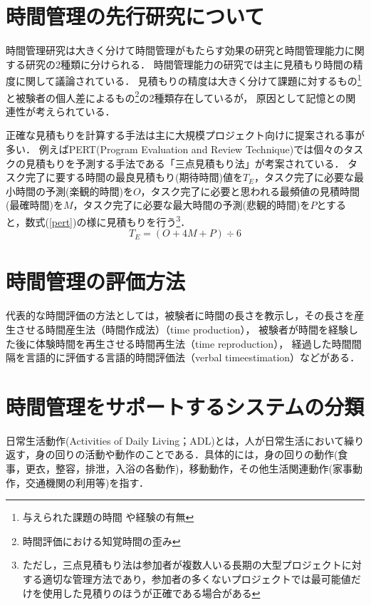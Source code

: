 \section{時間管理の先行研究について}
時間管理研究は大きく分けて時間管理がもたらす効果の研究と時間管理能力に関する研究の2種類に分けられる．
時間管理能力の研究では主に見積もり時間の精度に関して議論されている．
見積もりの精度は大きく分けて課題に対するもの\footnote{与えられた課題の時間 \cite{Roy2008}や経験の有無\cite{Roy2007}}と被験者の個人差によるもの\footnote{時間評価における知覚時間の歪み\cite{Oguro1961}\cite{Murakami2016}}の2種類存在しているが，
原因として記憶との関連性が考えられている\cite{Roy2005}．

正確な見積もりを計算する手法は主に大規模プロジェクト向けに提案される事が多い．
例えばPERT(Program Evaluation and Review Technique)では個々のタスクの見積もりを予測する手法である「三点見積もり法」が考案されている．
タスク完了に要する時間の最良見積もり(期待時間)値を$T_{E}$，タスク完了に必要な最小時間の予測(楽観的時間)を$O$，タスク完了に必要と思われる最頻値の見積時間(最確時間)を$M$，タスク完了に必要な最大時間の予測(悲観的時間)を$P$とすると，数式(\ref{pert})の様に見積もりを行う\footnote{ただし，三点見積もり法は参加者が複数人いる長期の大型プロジェクトに対する適切な管理方法であり，参加者の多くないプロジェクトでは最可能値だけを使用した見積りのほうが正確である場合がある\cite{Kato1965}}．
\begin{equation}
\label{pert}
T_{E} = (O + 4M + P) ÷ 6
\end{equation}

\section{時間管理の評価方法}
代表的な時間評価の方法としては，被験者に時間の長さを教示し，その長さを産生させる時間産生法（時間作成法）（time production），
被験者が時間を経験した後に体験時間を再生させる時間再生法（time reproduction），
経過した時間間隔を言語的に評価する言語的時間評価法（verbal timeestimation）などがある\cite{Oguro1961}\cite{Tayama2018}．

\section{時間管理をサポートするシステムの分類}
日常生活動作(Activities of Daily Living；ADL)とは，人が日常生活において繰り返す，身の回りの活動や動作のことである．具体的には，身の回りの動作(食事，更衣，整容，排泄，入浴の各動作)，移動動作，その他生活関連動作(家事動作，交通機関の利用等)を指す\cite{Sakai2003}．

